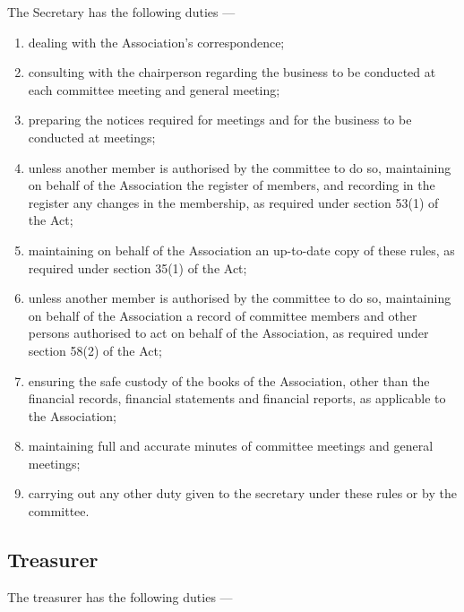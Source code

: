 \documentclass[../constitution.tex]{subfiles}
\begin{document}
The Secretary has the following duties ---

\begin{enumerate}
  \item dealing with the Association's correspondence;
  \item consulting with the chairperson regarding the business to be conducted at each committee meeting and general meeting;
  \item preparing the notices required for meetings and for the business to be conducted at meetings;
  \item unless another member is authorised by the committee to do so, maintaining on behalf of the Association the register of members, and recording in the register any changes in the membership, as required under section 53(1) of the Act;
  \item maintaining on behalf of the Association an up-to-date copy of these rules, as required under section 35(1) of the Act;
  \item unless another member is authorised by the committee to do so, maintaining on behalf of the Association a record of committee members and other persons authorised to act on behalf of the Association, as required under section 58(2) of the Act;
  \item ensuring the safe custody of the books of the Association, other than the financial records, financial statements and financial reports, as applicable to the Association;
  \item maintaining full and accurate minutes of committee meetings and general meetings;
  \item carrying out any other duty given to the secretary under these rules or by the committee.
\end{enumerate}

\hypertarget{treasurer}{%
\subsection{Treasurer}\label{treasurer}}

The treasurer has the following duties ---
\end{document}
